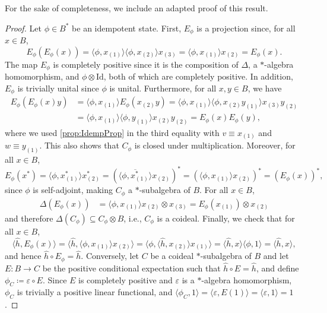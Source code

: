 \documentclass[a4paper,10pt]{amsart}
\newcommand{\eval}[2]{\langle #1 , #2\rangle}
\theoremstyle{definition}
\begin{document}
For the sake of completeness, we include an adapted proof of this result.

\begin{proof}
    Let $\phi \in B^*$ be an idempotent state. First, $E_\phi$ is a projection since, for all $x\in B$,
    \[
    E_\phi(E_\phi(x))=\eval{\phi}{x_{(1)}}\eval{\phi}{x_{(2)}} x_{(3)}=\eval{\phi}{x_{(1)}} x_{(2)} = E_\phi(x).
    \]
    The map $E_\phi$ is completely positive since it is the composition of $\Delta$, a $*$-algebra homomorphism, and $\phi \otimes \mathrm{Id}$, both of which are completely positive.
    In addition, $E_\phi$ is trivially unital since $\phi$ is unital.
    Furthermore, for all $x, y \in B$, we have
    \begin{align*}
        E_\phi(E_\phi(x)y)
        &=
        \eval{\phi}{x_{(1)}} E_\phi(x_{(2)} y)
        =
        \eval{\phi}{x_{(1)}}
            \eval{\phi}{x_{(2)} y_{(1)}}
                x_{(3)} y_{(2)}
        \\&=
        \eval{\phi}{x_{(1)}}
            \eval{\phi}{y_{(1)}} x_{(2)}
                y_{(2)}
        =
        E_\phi(x) E_\phi(y),
    \end{align*}
    where we used \cref{prop:IdempProp} in the third equality with $v \equiv x_{(1)}$ and $w \equiv y_{(1)}$. This also shows that $C_\phi$ is closed under multiplication. 
    Moreover, for all $x\in B$,
    \[
        E_\phi(x^*)
        =
        \eval{\phi}{x_{(1)}^*}x_{(2)}^*
        =
        (\overline{\eval{\phi}{x_{(1)}^*}}x_{(2)})^*
        =
        (\eval{\phi}{x_{(1)}}x_{(2)})^*
        =
        (E_\phi(x))^*,
    \]
    since $\phi$ is self-adjoint, making $C_\phi$ a $*$-subalgebra of $B$.
    For all $x \in B$,
    \begin{align*}
        \Delta(E_\phi(x))
        &=
        \eval{\phi}{x_{(1)}} x_{(2)} \otimes x_{(3)}
        =
        E_\phi(x_{(1)}) \otimes x_{(2)}
    \end{align*}
    and therefore $\Delta(C_\phi) \subseteq C_\phi \otimes B$, i.e., $C_\phi$ is a coideal.
    Finally, we check that for all $x \in B$,
    \[
    \eval{\hat{h}}{E_\phi(x)}
    =
    \eval{\hat{h}}{\eval{\phi}{x_{(1)}} x_{(2)}}
    =
    \eval{\phi}{\eval{\hat{h}}{x_{(2)}}x_{(1)}}
    =
    \eval{\hat{h}}{x}\eval{\phi}{1}
    =
    \eval{\hat{h}}{x},
    \]
    and hence $\hat{h}\circ E_\phi = \hat{h}$.
    \smallbreak\noindent%
    Conversely, let $C$ be a coideal $*$-subalgebra of $B$ and let $E : B \to C$ be the positive conditional expectation such that $\hat{h} \circ E = \hat{h}$, and define $\phi_C \coloneqq \varepsilon \circ E$. Since $E$ is completely positive and $\varepsilon$ is a $*$-algebra homomorphism, $\phi_C$ is trivially a positive linear functional, and $\eval{\phi_C}{1} = \eval{\varepsilon}{E(1)} = \eval{\varepsilon}{1} = 1$.

\end{proof}
\end{document}
